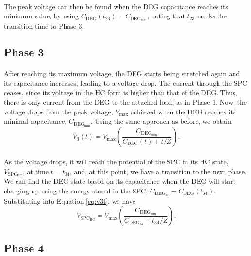 \paragraph{}The peak voltage can then be found when the DEG capacitance reaches its minimum value, by using $C_\text{DEG}(t_{23}) = C_{\text{DEG}_\text{min}}$, noting that $t_{23}$ marks the transition time to Phase 3.


\subsection{Phase 3}

\paragraph{} After reaching its maximum voltage, the DEG starts being stretched again and its capacitance increases, leading to a voltage drop. The current through the SPC ceases, since its voltage in the HC form is higher than that of the DEG. Thus, there is only current from the DEG to the attached load, as in Phase 1. Now, the voltage drops from the peak voltage, $V_\text{max}$ achieved when the DEG reaches its minimal capacitance, $C_{\text{DEG}_\text{min}}$. Using the same approach as before, we obtain
\begin{equation}\label{eq:v3t}
V_{3}(t) = V_\text{max}\left(\frac{C_{\text{DEG}_\text{min}}}{C_\text{DEG}(t)+t/Z}\right).
\end{equation}

\paragraph{} As the voltage drops, it will reach the potential of the SPC in its HC state, $V_{\text{SPC}_\text{HC}}$, at time $t=t_{34}$, and, at this point, we have a transition to the next phase. We can find the DEG state based on its capacitance when the DEG will start charging up using the energy stored in the SPC, $C_{\text{DEG}_{34}} = C_\text{DEG}(t_{34})$. Substituting into Equation \ref{eq:v3t}, we have
\begin{equation}
V_{\text{SPC}_\text{HC}} = V_\text{max}\left(\frac{C_{\text{DEG}_\text{min}}}{C_{\text{DEG}_{34}}+t_{34}/Z}\right).
\end{equation}

\subsection{Phase 4}

